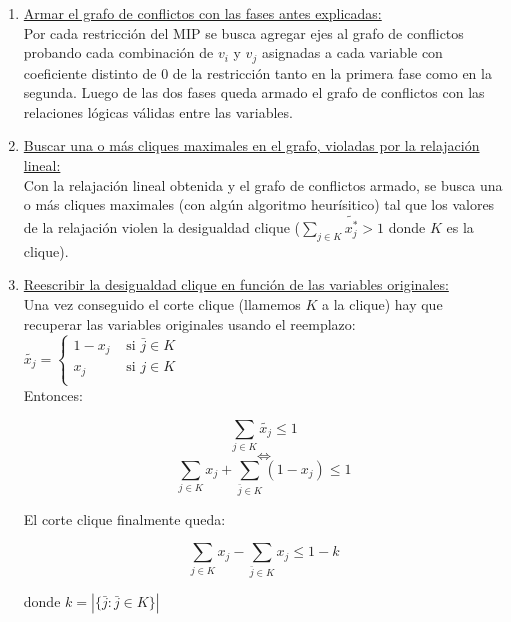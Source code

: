 \begin{enumerate}[ 1{)} ]
\item \underline{Armar el grafo de conflictos con las fases antes explicadas:}\\

Por cada restricci\'on del MIP se busca agregar ejes al grafo de conflictos probando cada combinaci\'on de $v_i$ y $v_j$ asignadas a cada variable con coeficiente distinto de 0 de la restricci\'on tanto en la primera fase como en la segunda. Luego de las dos fases queda armado el grafo de conflictos con las relaciones l\'ogicas v\'alidas entre las variables.

\item \underline{Buscar una o m\'as cliques maximales en el grafo, violadas por la relajaci\'on lineal:}\\

Con la relajaci\'on lineal obtenida y el grafo de conflictos armado, se busca una o m\'as cliques maximales (con algún algoritmo heurísitico) tal que los valores de la relajaci\'on violen la desigualdad clique ($\sum_{j\in K}\tilde{x^*_j} > 1$ donde $K$ es la clique).

\item \underline{Reescribir la desigualdad clique en función de las variables originales:}\\

Una vez conseguido el corte clique (llamemos $K$ a la clique) hay que recuperar las variables originales usando el reemplazo:
$\tilde{x_j} = 
\begin{cases}
1-x_j & \text{ si } \bar{j}\in K\\
x_j & \text{ si } j\in K\\
\end{cases}$\\

Entonces:

$$\sum_{j\in K}\tilde{x_j} \leq 1$$
$$\Longleftrightarrow$$
$$\sum_{j\in K}x_j + \sum_{\bar{j}\in K}(1-x_j) \leq 1$$

El corte clique finalmente queda:

$$\sum_{j\in K}x_j - \sum_{\bar{j}\in K}x_j \leq 1 - k$$

donde $k = |\{\bar{j} : \bar{j}\in K\}|$

\end{enumerate}

 
